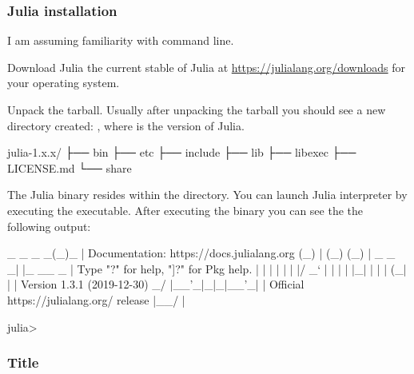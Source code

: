 \begin{frame}[fragile]
\frametitle{Julia installation}

I am assuming familiarity with command line.

Download Julia the current stable of Julia at
{\scriptsize\url{https://julialang.org/downloads}}
for your operating system.

Unpack the tarball. Usually after unpacking the tarball you should see a new directory
created: , where  is the version of Julia.

\begin{textcode}
julia-1.x.x/
├── bin
├── etc
├── include
├── lib
├── libexec
├── LICENSE.md
└── share
\end{textcode}

The Julia binary resides within the  directory. You can launch Julia interpreter
by executing the  executable. After executing the binary you can see the
the following output:
\begin{textcode}
                _
    _       _ _(_)_     |  Documentation: https://docs.julialang.org
   (_)     | (_) (_)    |
    _ _   _| |_  __ _   |  Type "?" for help, "]?" for Pkg help.
   | | | | | | |/ _` |  |
   | | |_| | | | (_| |  |  Version 1.3.1 (2019-12-30)
  _/ |\__'_|_|_|\__'_|  |  Official https://julialang.org/ release
 |__/                   |
 
 julia>
\end{textcode}

\end{frame}



\begin{frame}[fragile]
\frametitle{Title}


\end{frame}

